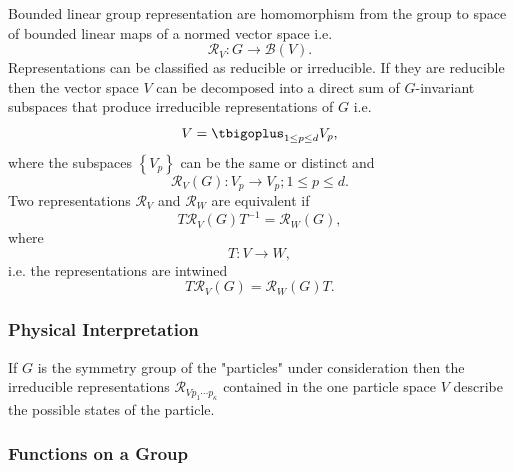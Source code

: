 \documentclass[aps,preprint]{revtex4}
\begin{document}
Bounded linear group representation are homomorphism from the group to space
of bounded linear maps of a normed vector space i.e. 
\begin{equation}
\mathcal{R}_{V}:G\rightarrow\mathcal{B}\left( V\right) .
\end{equation}
Representations can be classified as reducible or irreducible. If they are
reducible then the vector space $V$ can be decomposed into a direct sum of $%
G $-invariant subspaces that produce irreducible representations of $G$ i.e. 
\begin{equation}
V=\tbigoplus _{1\leq p\leq d}V_{p},
\end{equation}
where the subspaces $\left\{ V_{p}\right\} $ can be the same or distinct
and\qquad\qquad\qquad\qquad\ 
\begin{equation}
\mathcal{R}_{V}\left( G\right) :V_{p}\rightarrow V_{p};1\leq p\leq d.
\end{equation}
Two representations $\mathcal{R}_{V}$ and $\mathcal{R}_{W}$ are equivalent
if 
\begin{equation}
T\mathcal{R}_{V}\left( G\right) T^{-1}=\mathcal{R}_{W}\left( G\right) ,
\end{equation}
where%
\begin{equation}
T:V\rightarrow W,
\end{equation}
i.e. the representations are intwined 
\begin{equation}
T\mathcal{R}_{V}\left( G\right) =\mathcal{R}_{W}\left( G\right) T.
\end{equation}

\subsubsection{Physical Interpretation}

If $G$ is the symmetry group of the "particles" under consideration then the
irreducible representations $\mathcal{R}_{Vp_{1}\cdots p_{\kappa }}$
contained in the one particle space $V$ describe the possible states of the
particle.

\subsubsection{Functions on a Group}
\end{document}
